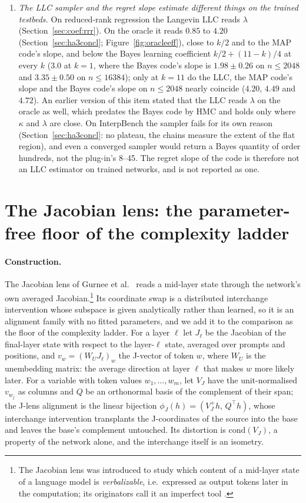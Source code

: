 \documentclass[11pt,a4paper]{article}
\begin{document}
\begin{enumerate}
\item \emph{The LLC sampler and the regret slope estimate different things on the trained testbeds.} On reduced-rank regression the Langevin LLC reads $\lambda$ (Section~\ref{sec:coef:rrr}). On the oracle it reads $0.85$ to $4.20$ (Section~\ref{sec:ha3concl}; Figure~\ref{fig:oracleeff}), close to $k/2$ and to the MAP code's slope, and below the Bayes learning coefficient $k/2+(11-k)/4$ at every $k$ ($3.0$ at $k=1$, where the Bayes code's slope is $1.98\pm0.26$ on $n\le2048$ and $3.35\pm0.50$ on $n\le16384$); only at $k=11$ do the LLC, the MAP code's slope and the Bayes code's slope on $n\le2048$ nearly coincide ($4.20$, $4.49$ and $4.72$). An earlier version of this item stated that the LLC reads $\lambda$ on the oracle as well, which predates the Bayes code by HMC and holds only where $\kappa$ and $\lambda$ are close. On InterpBench the sampler fails for its own reason (Section~\ref{sec:ha3concl}: no plateau, the chains measure the extent of the flat region), and even a converged sampler would return a Bayes quantity of order hundreds, not the plug-in's 8--45. The regret slope of the code is therefore not an LLC estimator on trained networks, and is not reported as one.
\end{enumerate}

\section{The Jacobian lens: the parameter-free floor of the complexity ladder}
\label{sec:jlens}

\paragraph{Construction.} The Jacobian lens of Gurnee et al.\ \cite{gurnee2026workspace} reads a mid-layer state through the network's own averaged Jacobian.\footnote{The Jacobian lens was introduced to study which content of a mid-layer state of a language model is \emph{verbalizable}, i.e.\ expressed as output tokens later in the computation; its originators call it an imperfect tool \cite{gurnee2026workspace}.} Its coordinate swap is a distributed interchange intervention whose subspace is given analytically rather than learned, so it is an alignment family with no fitted parameters, and we add it to the comparison as the floor of the complexity ladder. For a layer $\ell$ let $J_\ell$ be the Jacobian of the final-layer state with respect to the layer-$\ell$ state, averaged over prompts and positions, and $v_w=(W_UJ_\ell)_w$ the J-vector of token $w$, where $W_U$ is the unembedding matrix: the average direction at layer $\ell$ that makes $w$ more likely later. For a variable with token values $w_1,\dots,w_m$, let $V_J$ have the unit-normalised $v_{w_j}$ as columns and $Q$ be an orthonormal basis of the complement of their span; the J-lens alignment is the linear bijection $\phi_J(h)=(V_J^{+}h,\,Q^{\!\top}h)$, whose interchange intervention transplants the J-coordinates of the source into the base and leaves the base's complement untouched. Its distortion is $\mathrm{cond}(V_J)$, a property of the network alone, and the interchange itself is an isometry.
\end{document}
